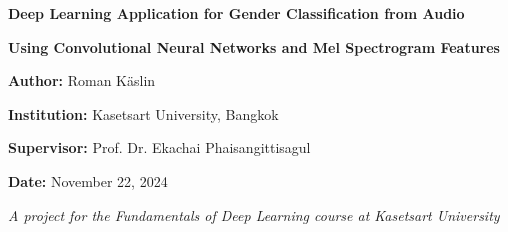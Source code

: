 \begin{titlepage}
    \centering
    
    {\Huge\bfseries Deep Learning Application for Gender Classification from Audio \par}
    \vspace{2cm}
    
    {\large\bfseries Using Convolutional Neural Networks and Mel Spectrogram Features \par}
    \vspace{2cm}
    
    {\large\textbf{Author:} Roman Käslin \par}
    \vspace{0.5cm}
    
    {\large\textbf{Institution:} Kasetsart University, Bangkok \par}
    \vspace{0.5cm}
    
    {\large\textbf{Supervisor:} Prof. Dr. Ekachai Phaisangittisagul \par}
    \vspace{2cm}
    
    {\large\textbf{Date:} November 22, 2024 \par}
    \vfill
    
    {\large\textit{A project for the Fundamentals of Deep Learning course at Kasetsart University}\par}
\end{titlepage}

